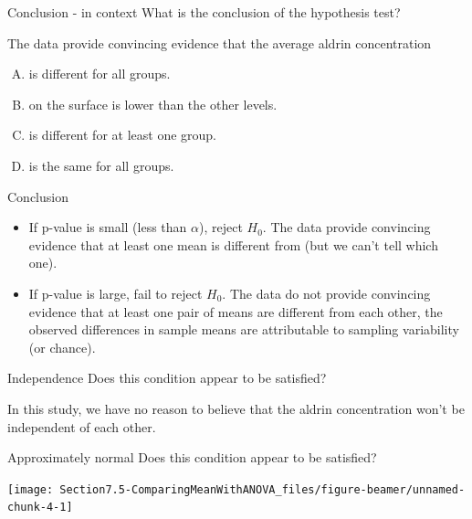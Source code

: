\documentclass[
  ignorenonframetext,
]{beamer}
\providecommand{\tightlist}{%
  \setlength{\itemsep}{0pt}\setlength{\parskip}{0pt}}
\begin{document}
\begin{frame}{Conclusion - in context}
\protect\hypertarget{conclusion---in-context-1}{}
\alert{What is the conclusion of the hypothesis test?}

The data provide convincing evidence that the average aldrin
concentration

\begin{enumerate}
[A)]
\item
  is different for all groups.
\item
  on the surface is lower than the other levels.
\item
  \alert{is different for at least one group.}
\item
  is the same for all groups.
\end{enumerate}
\end{frame}

\begin{frame}{Conclusion}
\protect\hypertarget{conclusion}{}
\begin{itemize}
\tightlist
\item
  If p-value is small (less than \(\alpha\)), reject \(H_0\). The data
  provide convincing evidence that at least one mean is different from
  (but we can't tell which one).
\end{itemize}

\pause

\begin{itemize}
\tightlist
\item
  If p-value is large, fail to reject \(H_0\). The data do not provide
  convincing evidence that at least one pair of means are different from
  each other, the observed differences in sample means are attributable
  to sampling variability (or chance).
\end{itemize}
\end{frame}

\begin{frame}{Independence}
\protect\hypertarget{independence}{}
\alert{Does this condition appear to be satisfied?}

\pause

In this study, we have no reason to believe that the aldrin
concentration won't be independent of each other.
\end{frame}

\begin{frame}{Approximately normal}
\protect\hypertarget{approximately-normal}{}
\alert{Does this condition appear to be satisfied?}

\begin{center}\texttt{[image: Section7.5-ComparingMeanWithANOVA\_files/figure-beamer/unnamed-chunk-4-1]} \end{center}
\end{frame}
\end{document}
